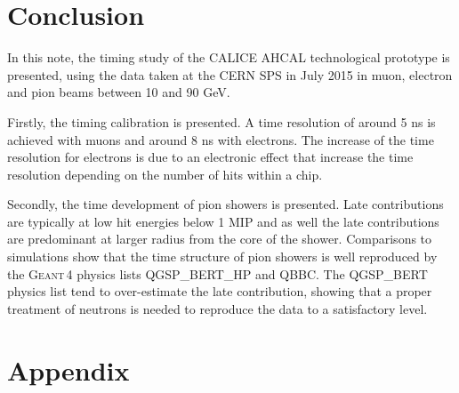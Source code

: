 \documentclass{JINST}
\newcommand\geant{\textsc{Geant\,4}\xspace}
\begin{document}
\section{Conclusion}

In this note, the timing study of the CALICE AHCAL technological prototype is presented, using the data taken at the CERN SPS in July 2015 in muon, electron and pion beams between 10 and 90 GeV.

Firstly, the timing calibration is presented. A time resolution of around 5 ns is achieved with muons and around 8 ns with electrons. The increase of the time resolution for electrons is due to an electronic effect that increase the time resolution depending on the number of hits within a chip.

Secondly, the time development of pion showers is presented. Late contributions are typically at low hit energies below 1 MIP and as well the late contributions are predominant at larger radius from the core of the shower. Comparisons to simulations show that the time structure of pion showers is well reproduced by the \geant physics lists QGSP\_BERT\_HP and QBBC. The QGSP\_BERT physics list tend to over-estimate the late contribution, showing that a proper treatment of neutrons is needed to reproduce the data to a satisfactory level.




% 

\clearpage

\appendix
\section{Appendix}
\end{document}

